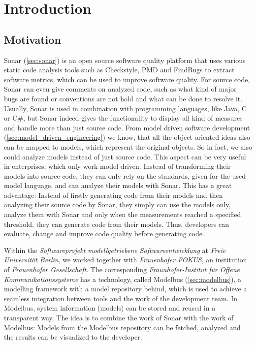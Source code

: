 \chapter{Introduction}

\section{Motivation}
Sonar (\autoref{sec:sonar}) is an open source software quality platform that uses various static code analysis tools such as Checkstyle, PMD and FindBugs to extract software metrics, which can be used to improve software quality. For source code, Sonar can even give comments on analyzed code, such as what kind of major bugs are found or conventions are not hold and what can be done to resolve it. Usually, Sonar is used in combination with programming languages, like Java, C or C\#, but Sonar indeed gives the functionality to display all kind of measures and handle more than just source code. From model driven software development (\autoref{sec:model_driven_engineering}) we know, that all the object oriented ideas also can be mapped to models, which represent the original objects. So in fact, we also could analyze models instead of just source code. This aspect can be very useful in enterprises, which only work model driven. Instead of transforming their models into source code, they can only rely on the standards, given for the used model language, and can analyze their models with Sonar. This has a great advantage: Instead of firstly generating code from their models and then analyzing their source code by Sonar, they simply can use the models only, analyze them with Sonar and only when the measurements reached a specified threshold, they can generate code from their models. Thus, developers can evaluate, change and improve code quality before generating code. 

Within the \textit{Softwareprojekt modellgetriebene Softwareentwicklung} at \textit{Freie Universit\"at Berlin}, we worked together with \textit{Frauenhofer FOKUS}, an institution of \textit{Frauenhofer Gesellschaft}. The corresponding \textit{Fraunhofer-Institut für Offene Kommunikationssysteme} has a technology, called Modelbus (\autoref{sec:modelbus}), a modelling framework with a model repository behind, which is used to achieve a seamless integration between tools and the work of the development team. In Modelbus, system information (models) can be stored and reused in a transparent way. The idea is to combine the work of Sonar with the work of Modelbus: Models from the Modelbus repository can be fetched, analyzed and the results can be visualized to the developer.

